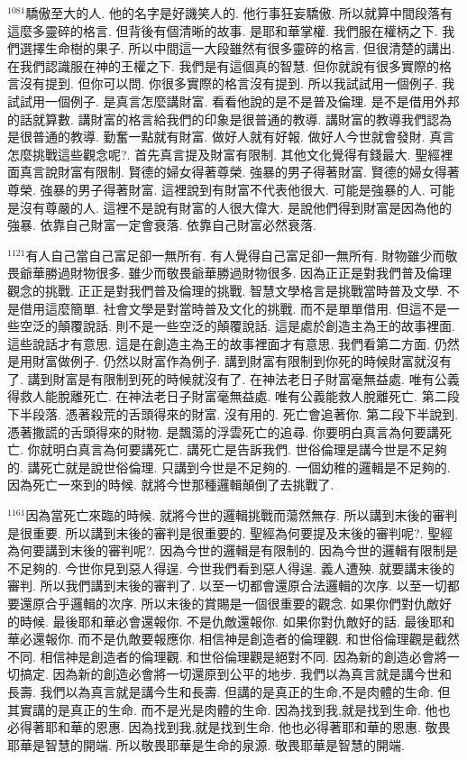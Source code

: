 \documentclass{book}
\begin{document}
$^{1081}$驕傲至大的人.
他的名字是好譏笑人的.
他行事狂妄驕傲.
所以就算中間段落有這麼多靈碎的格言.
但背後有個清晰的故事.
是耶和華掌權.
我們服在權柄之下.
我們選擇生命樹的果子.
所以中間這一大段雖然有很多靈碎的格言.
但很清楚的講出.
在我們認識服在神的王權之下.
我們是有這個真的智慧.
但你就說有很多實際的格言沒有提到.
但你可以問.
你很多實際的格言沒有提到.
所以我試試用一個例子.
我試試用一個例子.
是真言怎麼講財富.
看看他說的是不是普及倫理.
是不是借用外邦的話就算數.
講財富的格言給我們的印象是很普通的教導.
講財富的教導我們認為是很普通的教導.
勤奮一點就有財富.
做好人就有好報.
做好人今世就會發財.
真言怎麼挑戰這些觀念呢?.
首先真言提及財富有限制.
其他文化覺得有錢最大.
聖經裡面真言說財富有限制.
賢德的婦女得著尊榮.
強暴的男子得著財富.
賢德的婦女得著尊榮.
強暴的男子得著財富.
這裡說到有財富不代表他很大.
可能是強暴的人.
可能是沒有尊嚴的人.
這裡不是說有財富的人很大偉大.
是說他們得到財富是因為他的強暴.
依靠自己財富一定會衰落.
依靠自己財富必然衰落.

$^{1121}$有人自己當自己富足卻一無所有.
有人覺得自己富足卻一無所有.
財物雖少而敬畏爺華勝過財物很多.
雖少而敬畏爺華勝過財物很多.
因為正正是對我們普及倫理觀念的挑戰.
正正是對我們普及倫理的挑戰.
智慧文學格言是挑戰當時普及文學.
不是借用這麼簡單.
社會文學是對當時普及文化的挑戰.
而不是單單借用.
但這不是一些空泛的顛覆說話.
則不是一些空泛的顛覆說話.
這是處於創造主為王的故事裡面.
這些說話才有意思.
這是在創造主為王的故事裡面才有意思.
我們看第二方面.
仍然是用財富做例子.
仍然以財富作為例子.
講到財富有限制到你死的時候財富就沒有了.
講到財富是有限制到死的時候就沒有了.
在神法老日子財富毫無益處.
唯有公義得救人能脫離死亡.
在神法老日子財富毫無益處.
唯有公義能救人脫離死亡.
第二段下半段落.
憑著殺荒的舌頭得來的財富.
沒有用的.
死亡會追著你.
第二段下半說到.
憑著撒謊的舌頭得來的財物.
是飄蕩的浮雲死亡的追尋.
你要明白真言為何要講死亡.
你就明白真言為何要講死亡.
講死亡是告訴我們.
世俗倫理是講今世是不足夠的.
講死亡就是說世俗倫理.
只講到今世是不足夠的.
一個幼稚的邏輯是不足夠的.
因為死亡一來到的時候.
就將今世那種邏輯顛倒了去挑戰了.

$^{1161}$因為當死亡來臨的時候.
就將今世的邏輯挑戰而蕩然無存.
所以講到末後的審判是很重要.
所以講到末後的審判是很重要的.
聖經為何要提及末後的審判呢?.
聖經為何要講到末後的審判呢?.
因為今世的邏輯是有限制的.
因為今世的邏輯有限制是不足夠的.
今世你見到惡人得逞.
今世我們看到惡人得逞.
義人遭殃.
就要講末後的審判.
所以我們講到末後的審判了.
以至一切都會還原合法邏輯的次序.
以至一切都要還原合乎邏輯的次序.
所以末後的賞賜是一個很重要的觀念.
如果你們對仇敵好的時候.
最後耶和華必會還報你.
不是仇敵還報你.
如果你對仇敵好的話.
最後耶和華必還報你.
而不是仇敵要報應你.
相信神是創造者的倫理觀.
和世俗倫理觀是截然不同.
相信神是創造者的倫理觀.
和世俗倫理觀是絕對不同.
因為新的創造必會將一切搞定.
因為新的創造必會將一切還原到公平的地步.
我們以為真言就是講今世和長壽.
我們以為真言就是講今生和長壽.
但講的是真正的生命,不是肉體的生命.
但其實講的是真正的生命.
而不是光是肉體的生命.
因為找到我,就是找到生命.
他也必得著耶和華的恩惠.
因為找到我,就是找到生命.
他也必得著耶和華的恩惠.
敬畏耶華是智慧的開端.
所以敬畏耶華是生命的泉源.
敬畏耶華是智慧的開端.
\end{document}
